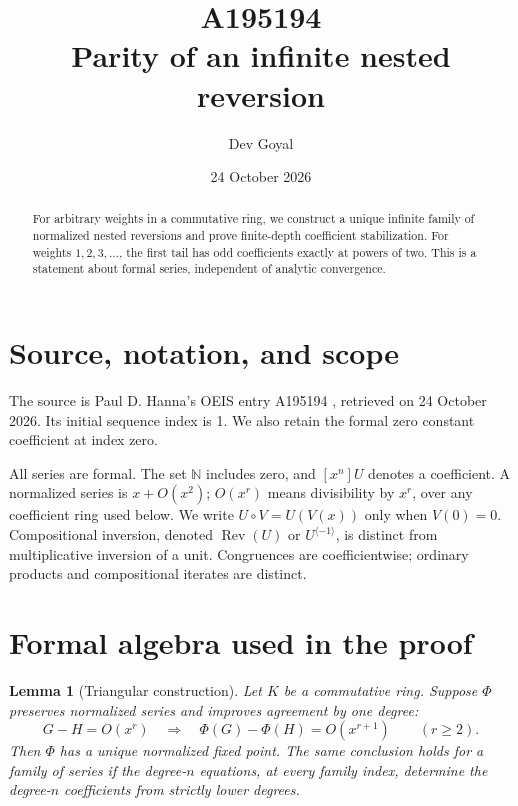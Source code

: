 \documentclass[11pt,a4paper]{article}
\title{A195194\\[4pt]\large Parity of an infinite nested reversion}
\author{Dev Goyal}
\date{24 October 2026}
\newtheorem{lemma}[theorem]{Lemma}
\theoremstyle{remark}
\newcommand{\N}{\mathbb N}
\newcommand{\Rev}{\operatorname{Rev}}
\newcommand{\rev}{^{\langle-1\rangle}}
\begin{document}
\maketitle
\begin{center}
\end{center}
\begin{abstract}
For arbitrary weights in a commutative ring, we construct a unique infinite family of normalized nested reversions and prove finite-depth coefficient stabilization. For weights $1,2,3,\ldots$, the first tail has odd coefficients exactly at powers of two. This is a statement about formal series, independent of analytic convergence.
\end{abstract}

\section{Source, notation, and scope}

The source is Paul D. Hanna's OEIS entry A195194 \cite{oeis194},
retrieved on 24 October 2026. Its initial sequence index is 1.
We also retain the formal zero constant coefficient at index zero.

All series are formal. The set $\N$ includes zero, and $[x^n]U$ denotes a
coefficient. A normalized series is $x+O(x^2)$; $O(x^r)$ means divisibility
by $x^r$, over any coefficient ring used below. We write $U\circ V=U(V(x))$
only when $V(0)=0$. Compositional inversion, denoted $\Rev(U)$ or $U\rev$,
is distinct from multiplicative inversion of a unit. Congruences are
coefficientwise; ordinary products and compositional iterates are distinct.

\section{Formal algebra used in the proof}

\begin{lemma}[Triangular construction]\label{lem:construction}
Let $K$ be a commutative ring. Suppose $\Phi$ preserves normalized series
and improves agreement by one degree:
\[
 G-H=O(x^r)\quad\Longrightarrow\quad
 \Phi(G)-\Phi(H)=O(x^{r+1})\qquad(r\ge2).
\]
Then $\Phi$ has a unique normalized fixed point. The same conclusion holds
for a family of series if the degree-$n$ equations, at every family index,
determine the degree-$n$ coefficients from strictly lower degrees.
\end{lemma}
\end{document}
